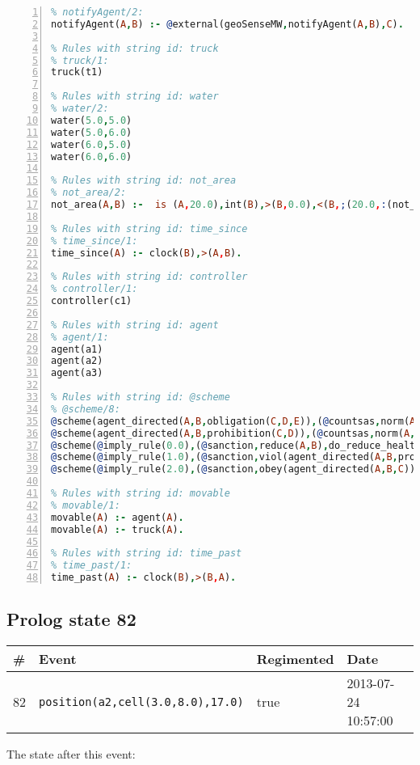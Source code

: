 \documentclass[11pt]{article}\usepackage[utf8]{inputenc}\usepackage{geometry}
\begin{document}
\begin{lstlisting}[language=Prolog, numbers=left]
% Rules with string id: notifyAgent
% notifyAgent/2:
notifyAgent(A,B) :- @external(geoSenseMW,notifyAgent(A,B),C).

% Rules with string id: truck
% truck/1:
truck(t1)

% Rules with string id: water
% water/2:
water(5.0,5.0)
water(5.0,6.0)
water(6.0,5.0)
water(6.0,6.0)

% Rules with string id: not_area
% not_area/2:
not_area(A,B) :-  is (A,20.0),int(B),>(B,0.0),<(B,;(20.0,:(not_area(A,B), is (-(B),20.0)))),int(A),>(A,0.0),<(A,;(20.0,:(area(A,B),-(int(A))))),int(B),>(A,0.0),>(B,0.0),<(A,21.0),<(B,21.0).

% Rules with string id: time_since
% time_since/1:
time_since(A) :- clock(B),>(A,B).

% Rules with string id: controller
% controller/1:
controller(c1)

% Rules with string id: agent
% agent/1:
agent(a1)
agent(a2)
agent(a3)

% Rules with string id: @scheme
% @scheme/8:
@scheme(agent_directed(A,B,obligation(C,D,E)),(@countsas,norm(A,B,F,obligation(C,D,E)),F),false,(listTrue(C)),(time_past(D)),false,[plus(viol(agent_directed(A,B,obligation(C,D,E))))|[]],[plus(obey(agent_directed(A,B,obligation(C,D,E))))|[]])
@scheme(agent_directed(A,B,prohibition(C,D)),(@countsas,norm(A,B,E,prohibition(C,D)),E),(listTrue(C)),false,(false),false,[plus(viol(agent_directed(A,B,prohibition(C,D))))|[]],[plus(obey(agent_directed(A,B,prohibition(C,D))))|[]])
@scheme(@imply_rule(0.0),(@sanction,reduce(A,B),do_reduce_health(A,B),notifyAgent(A,changed(status))),true,false,false,false,[min(reduce(A,B))|[]],[])
@scheme(@imply_rule(1.0),(@sanction,viol(agent_directed(A,B,prohibition(C,D))),do_sanction(D)),true,false,false,false,[min(viol(agent_directed(A,B,prohibition(C,D))))|[]],[])
@scheme(@imply_rule(2.0),(@sanction,obey(agent_directed(A,B,C))),true,false,false,false,[min(obey(agent_directed(A,B,C)))|[]],[])

% Rules with string id: movable
% movable/1:
movable(A) :- agent(A).
movable(A) :- truck(A).

% Rules with string id: time_past
% time_past/1:
time_past(A) :- clock(B),>(B,A).

\end{lstlisting}
\clearpage 
\subsection{Prolog state 82}
\begin{table}[ht]
\centering 
\begin{tabular}{l l l l} 
\textbf{\#} & \textbf{Event} & \textbf{Regimented} & \textbf{Date} \\ [0.5ex] 
\hline
82&\texttt{position(a2,cell(3.0,8.0),17.0)}&true&2013-07-24 10:57:00\\ [1ex] \hline\end{tabular}
\end{table}
The state after this event:
\end{document}
